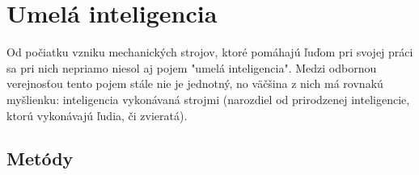 \section{Umelá inteligencia}\label{sec:ai}

Od počiatku vzniku mechanických strojov, ktoré pomáhajú ľuďom pri svojej práci sa pri nich nepriamo niesol aj pojem
"umelá inteligencia".
Medzi odbornou verejnosťou tento pojem stále nie je jednotný, no väčšina z nich má rovnakú myšlienku:
inteligencia vykonávaná strojmi (narozdiel od prirodzenej inteligencie, ktorú vykonávajú ľudia, či zvieratá).

\subsection{Metódy}\label{subsec:ai-methods}